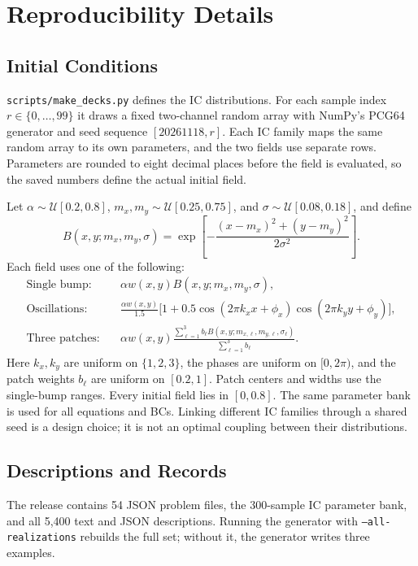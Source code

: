 \section{Reproducibility Details}
\label{app:reproducibility}
\subsection{Initial Conditions}
\texttt{scripts/make\_decks.py} defines the IC distributions. For each sample index $r\in\{0,\ldots,99\}$ it draws a fixed two-channel random array with NumPy's PCG64 generator and seed sequence $[20261118,r]$. Each IC family maps the same random array to its own parameters, and the two fields use separate rows. Parameters are rounded to eight decimal places before the field is evaluated, so the saved numbers define the actual initial field.

Let $\alpha\sim\mathcal U[0.2,0.8]$, $m_x,m_y\sim\mathcal U[0.25,0.75]$, and $\sigma\sim\mathcal U[0.08,0.18]$, and define
\[
 B(x,y;m_x,m_y,\sigma)=
 \exp\!\left[-\frac{(x-m_x)^2+(y-m_y)^2}{2\sigma^2}\right].
\]
Each field uses one of the following:
\begin{align*}
 \text{Single bump:}\quad &\alpha w(x,y)B(x,y;m_x,m_y,\sigma),\\
 \text{Oscillations:}\quad &\frac{\alpha w(x,y)}{1.5}
 \big[1+0.5\cos(2\pi k_xx+\phi_x)\cos(2\pi k_yy+\phi_y)\big],\\
 \text{Three patches:}\quad &\alpha w(x,y)
 \frac{\sum_{\ell=1}^3 b_\ell B(x,y;m_{x,\ell},m_{y,\ell},\sigma_\ell)}
 {\sum_{\ell=1}^3 b_\ell}.
\end{align*}
Here $k_x,k_y$ are uniform on $\{1,2,3\}$, the phases are uniform on $[0,2\pi)$, and the patch weights $b_\ell$ are uniform on $[0.2,1]$. Patch centers and widths use the single-bump ranges. Every initial field lies in $[0,0.8]$. The same parameter bank is used for all equations and BCs. Linking different IC families through a shared seed is a design choice; it is not an optimal coupling between their distributions.

\subsection{Descriptions and Records}
The release contains 54 JSON problem files, the 300-sample IC parameter bank, and all 5,400 text and JSON descriptions. Running the generator with \texttt{--all-realizations} rebuilds the full set; without it, the generator writes three examples.

